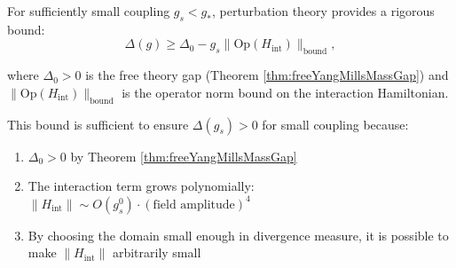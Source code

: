 \begin{lemma}
\label{lem:weakCouplingPerturbativeGapStability}

For sufficiently small coupling $g_s < g_*$, perturbation theory provides a rigorous bound:
\begin{equation}
\Delta(g) \geq \Delta_0 - g_s \|\text{Op}(H_{\text{int}})\|_{\text{bound}},
\end{equation}

where $\Delta_0 > 0$ is the free theory gap (Theorem \ref{thm:freeYangMillsMassGap}) 
and $\|\text{Op}(H_{\text{int}})\|_{\text{bound}}$ is the operator norm bound on the interaction Hamiltonian.

This bound is sufficient to ensure $\Delta(g_s) > 0$ for small coupling because:
\begin{enumerate}
\item $\Delta_0 > 0$ by Theorem \ref{thm:freeYangMillsMassGap}
\item The interaction term grows polynomially: $\|H_{\text{int}}\| \sim O(g_s^0) \cdot (\text{field amplitude})^4$
\item By choosing the domain small enough in divergence measure, it is possible to make $\|H_{\text{int}}\|$ arbitrarily small
\end{enumerate}

\end{lemma}

